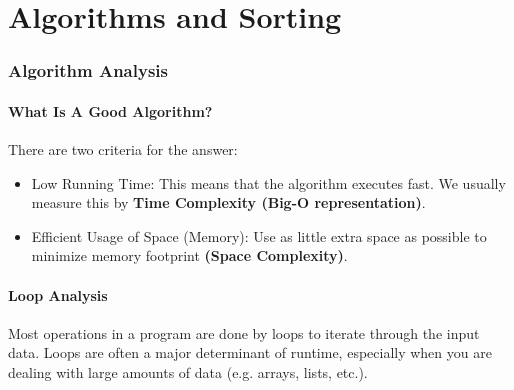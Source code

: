 \documentclass[letterpaper,12pt]{article}
\begin{document}
\part{Algorithms and Sorting}

\section{Algorithm Analysis}
\subsection{What Is A Good Algorithm?}
There are two criteria for the answer:
\begin{itemize}
    \item Low Running Time: This means that the algorithm executes fast. We usually measure this by \textbf{Time Complexity (Big-O representation)}.
    \item Efficient Usage of Space (Memory): Use as little extra space as possible to minimize memory footprint \textbf{(Space Complexity)}.
\end{itemize}

\subsection{Loop Analysis}
Most operations in a program are done by loops to iterate through the input data. Loops are often a major determinant of runtime, especially when you are dealing with large amounts of data (e.g. arrays, lists, etc.).
\end{document}
